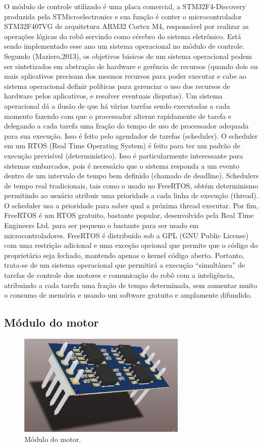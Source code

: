 \documentclass[letterpaper, 10 pt, conference]{ieeeconf}  %
\begin{document}
O módulo de controle utilizado é uma placa comercial, a STM32F4-Discovery produzida pela STMicroelectronics e sua função é conter o microcontrolador STM32F407VG de arquitetura ARM32 Cortex M4, responsável por realizar as operações lógicas do robô servindo como cérebro do sistema eletrônico.
Está sendo implementado esse ano um sistema operacional no módulo de controle. Segundo (Maziero,2013)\cite{maziero}, os objetivos básicos de um sistema operacional podem ser sintetizados em abstração de hardware e gerência de recursos (quando dois ou mais aplicativos precisam dos mesmos recursos para poder executar e cabe ao sistema operacional definir políticas para gerenciar o uso dos recursos de hardware pelos aplicativos, e resolver eventuais disputas).
Um sistema operacional dá a ilusão de que há várias tarefas sendo executadas a cada momento fazendo com que o processador alterne rapidamente de tarefa e delegando a cada tarefa uma fração do tempo de uso de processador adequada para sua execução. Isso é feito pelo agendador de tarefas (scheduler). 
O scheduler em um RTOS (Real Time Operating System) é feito para ter um padrão de execução previsível (determinístico). Isso é particularmente interessante para sistemas embarcados, pois é necessário que o sistema responda a um evento dentro de um intervalo de tempo bem definido (chamado de deadline). Schedulers de tempo real tradicionais, tais como o usado no FreeRTOS, obtém determinismo permitindo ao usuário atribuir uma prioridade a cada linha de execução (thread). O scheduler usa a prioridade para saber qual a próxima thread executar.
Por fim, FreeRTOS é um RTOS gratuito, bastante popular, desenvolvido pela Real Time Engineers Ltd. para ser pequeno o bastante para ser usado em microcontroladores. FreeRTOS é distribuído sob a GPL (GNU Public License) com uma restrição adicional e uma exceção opcional que permite que o código do proprietário seja fechado, mantendo apenas o kernel código aberto.
Portanto, trata-se de um sistema operacional que permitirá a execução “simultânea” de tarefas de controle dos motores e comunicação do robô com a inteligência, atribuindo a cada tarefa uma fração de tempo determinada, sem aumentar muito o consumo de memória e usando um software gratuito e amplamente difundido.

\subsection{Módulo do motor}

\begin{figure}[thpb]	
	\centering
	\includegraphics[width=8cm]{img/modulomotor}
	\caption{Módulo do motor.}
	\label{img:modulomotor}
\end{figure}
\end{document}
